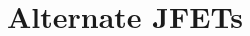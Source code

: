 \documentclass[11pt]{article}
\begin{document}

\section{Alternate JFETs}

\begin{circuitdiagram}[]{20}{15}
\circledtrans



\end{circuitdiagram}

\end{document}

